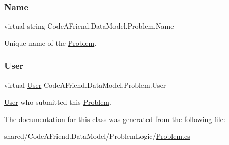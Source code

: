 \subsubsection{\texorpdfstring{Name}{Name}}
{\footnotesize\ttfamily virtual string Code\+A\+Friend.\+Data\+Model.\+Problem.\+Name\hspace{0.3cm}{\ttfamily [get]}}



Unique name of the \mbox{\hyperlink{class_code_a_friend_1_1_data_model_1_1_problem}{Problem}}.

\mbox{\label{class_code_a_friend_1_1_data_model_1_1_problem_a16adf7da62fca6b430006e5d0c099c96}} 
\subsubsection{\texorpdfstring{User}{User}}
{\footnotesize\ttfamily virtual \mbox{\hyperlink{class_code_a_friend_1_1_data_model_1_1_user}{User}} Code\+A\+Friend.\+Data\+Model.\+Problem.\+User\hspace{0.3cm}{\ttfamily [get]}}



\mbox{\hyperlink{class_code_a_friend_1_1_data_model_1_1_user}{User}} who submitted this \mbox{\hyperlink{class_code_a_friend_1_1_data_model_1_1_problem}{Problem}}.



The documentation for this class was generated from the following file\+:\begin{DoxyCompactItemize}
\item 
shared/\+Code\+A\+Friend.\+Data\+Model/\+Problem\+Logic/\mbox{\hyperlink{_problem_8cs}{Problem.\+cs}}\end{DoxyCompactItemize}
